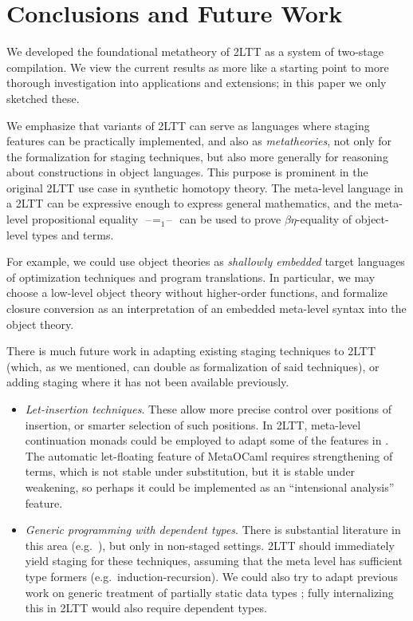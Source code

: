 \documentclass[acmsmall,screen]{acmart}
\newcommand{\blank}{{\mathord{\hspace{1pt}\text{--}\hspace{1pt}}}}
\theoremstyle{remark}
\begin{document}
\section{Conclusions and Future Work}\label{sec:conclusions}

We developed the foundational metatheory of 2LTT as a system of
two-stage compilation. We view the current results as more like a starting point
to more thorough investigation into applications and extensions; in this paper
we only sketched these.

We emphasize that variants of 2LTT can serve as languages where staging
features can be practically implemented, and also as \emph{metatheories}, not
only for the formalization for staging techniques, but also more generally for
reasoning about constructions in object languages. This purpose is prominent in
the original 2LTT use case in synthetic homotopy theory. The meta-level language
in a 2LTT can be expressive enough to express general mathematics, and the
meta-level propositional equality $\blank\!=_1\!\blank$ can be used to prove
$\beta\eta$-equality of object-level types and terms.

For example, we could use object theories as \emph{shallowly embedded} target
languages of optimization techniques and program translations. In particular, we
may choose a low-level object theory without higher-order functions, and
formalize closure conversion as an interpretation of an embedded meta-level
syntax into the object theory.

There is much future work in adapting existing staging techniques to 2LTT
(which, as we mentioned, can double as formalization of said techniques), or
adding staging where it has not been available previously.
\begin{itemize}
\item \emph{Let-insertion techniques}. These allow more precise control over
  positions of insertion, or smarter selection of such positions. In 2LTT,
  meta-level continuation monads could be employed to adapt some of the features
  in \cite{DBLP:journals/jfp/KameyamaKS11}. The automatic let-floating feature
  of MetaOCaml \cite{DBLP:journals/corr/abs-2201-00495} requires strengthening
  of terms, which is not stable under substitution, but it is stable under
  weakening, so perhaps it could be implemented as an ``intensional analysis''
  feature.
\item \emph{Generic programming with dependent types}. There is substantial
  literature in this area
  (e.g.\ \cite{loh11generic,chapman2010gentle,diehl-thesis,ornaments}), but only
  in non-staged settings.  2LTT should immediately yield staging for these
  techniques, assuming that the meta level has sufficient type formers
  (e.g.\ induction-recursion). We could also try to adapt previous work on
  generic treatment of partially static data types
  \cite{DBLP:journals/pacmpl/YallopGK18}; fully internalizing this in 2LTT would
  also require dependent types.
\end{itemize}
\end{document}

